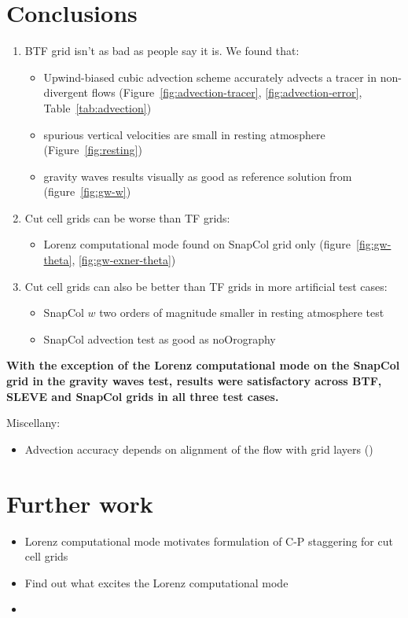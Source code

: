 \documentclass[twocol]{ametsoc}
\begin{document}
\section{Conclusions}
\begin{enumerate}
	\item BTF grid isn't as bad as people say it is.  We found that:
	\begin{itemize}
		\item Upwind-biased cubic advection scheme accurately advects a tracer in non-divergent flows (Figure~\ref{fig:advection-tracer}, \ref{fig:advection-error}, Table~\ref{tab:advection})
		\item spurious vertical velocities are small in resting atmosphere (Figure~\ref{fig:resting})
		\item gravity waves results visually as good as reference solution from \citet{melvin2010} (figure~\ref{fig:gw-w})
	\end{itemize}

	\item Cut cell grids can be worse than TF grids:
	\begin{itemize}
		\item Lorenz computational mode found on SnapCol grid only (figure~\ref{fig:gw-theta}, \ref{fig:gw-exner-theta})
	\end{itemize}

	\item Cut cell grids can also be better than TF grids in more artificial test cases:
	\begin{itemize}
		\item SnapCol $w$ two orders of magnitude smaller in resting atmosphere test
		\item SnapCol advection test as good as noOrography
	\end{itemize}
\end{enumerate}

\textbf{With the exception of the Lorenz computational mode on the SnapCol grid in the gravity waves test, results were satisfactory across BTF, SLEVE and SnapCol grids in all three test cases.}

Miscellany:
\begin{itemize}
	\item Advection accuracy depends on alignment of the flow with grid layers ()
\end{itemize}

\section{Further work}
\begin{itemize}
	\item Lorenz computational mode motivates formulation of C-P staggering for cut cell grids
	\item Find out what excites the Lorenz computational mode
	\item {}
\end{itemize}
\end{document}

